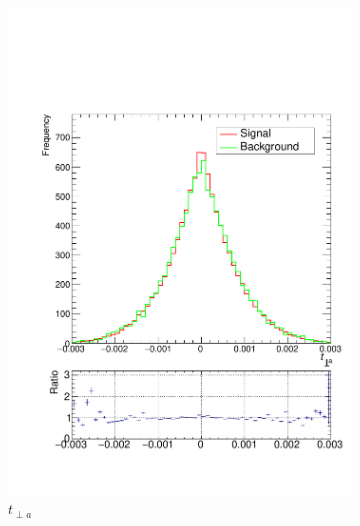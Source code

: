 \documentclass[10pt,a4paper]{book}
\begin{document}
\begin{figure}
\begin{subfigure}{0.33\textwidth}
\includegraphics[scale=0.25]{reco/tper1}
\caption{$t_{\perp a}$}
\end{subfigure}
\begin{subfigure}{.33\textwidth}
\centering

\end{subfigure}
\end{figure}
\end{document}
